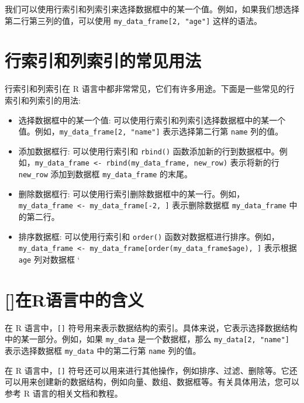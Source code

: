 \documentclass[
  letterpaper,
  DIV=11,
  numbers=noendperiod]{scrreprt}
\providecommand{\tightlist}{%
  \setlength{\itemsep}{0pt}\setlength{\parskip}{0pt}}\usepackage{longtable,booktabs,array}
\begin{document}
我们可以使用行索引和列索引来选择数据框中的某一个值。例如，如果我们想选择第二行第三列的值，可以使用
\texttt{my\_data\_frame{[}2,\ "age"{]}} 这样的语法。

\hypertarget{ux884cux7d22ux5f15ux548cux5217ux7d22ux5f15ux7684ux5e38ux89c1ux7528ux6cd5}{%
\section{行索引和列索引的常见用法}\label{ux884cux7d22ux5f15ux548cux5217ux7d22ux5f15ux7684ux5e38ux89c1ux7528ux6cd5}}

行索引和列索引在 R
语言中都非常常见，它们有许多用途。下面是一些常见的行索引和列索引的用法:

\begin{itemize}
\tightlist
\item
  选择数据框中的某一个值:
  可以使用行索引和列索引选择数据框中的某一个值。例如，\texttt{my\_data\_frame{[}2,\ "name"{]}}
  表示选择第二行第 \texttt{name} 列的值。
\item
  添加数据框行: 可以使用行索引和 \texttt{rbind()}
  函数添加新的行到数据框中。例如，\texttt{my\_data\_frame\ \textless{}-\ rbind(my\_data\_frame,\ new\_row)}
  表示将新的行 \texttt{new\_row} 添加到数据框 \texttt{my\_data\_frame}
  的末尾。
\item
  删除数据框行:
  可以使用行索引删除数据框中的某一行。例如，\texttt{my\_data\_frame\ \textless{}-\ my\_data\_frame{[}-2,\ {]}}
  表示删除数据框 \texttt{my\_data\_frame} 中的第二行。
\item
  排序数据框: 可以使用行索引和 \texttt{order()}
  函数对数据框进行排序。例如，\texttt{my\_data\_frame\ \textless{}-\ my\_data\_frame{[}order(my\_data\_frame\$age),\ {]}}
  表示根据 \texttt{age} 列对数据框 `
\end{itemize}

\hypertarget{ux5728rux8bedux8a00ux4e2dux7684ux542bux4e49}{%
\section{{[}{]}在R语言中的含义}\label{ux5728rux8bedux8a00ux4e2dux7684ux542bux4e49}}

在 R 语言中，\texttt{{[}{]}}
符号用来表示数据结构的索引。具体来说，它表示选择数据结构中的某一部分。例如，如果
\texttt{my\_data} 是一个数据框，那么 \texttt{my\_data{[}2,\ "name"{]}}
表示选择数据框 \texttt{my\_data} 中的第二行第 \texttt{name} 列的值。

在 R 语言中，\texttt{{[}{]}}
符号还可以用来进行其他操作，例如排序、过滤、删除等。它还可以用来创建新的数据结构，例如向量、数组、数据框等。有关具体用法，您可以参考
R 语言的相关文档和教程。
\end{document}
